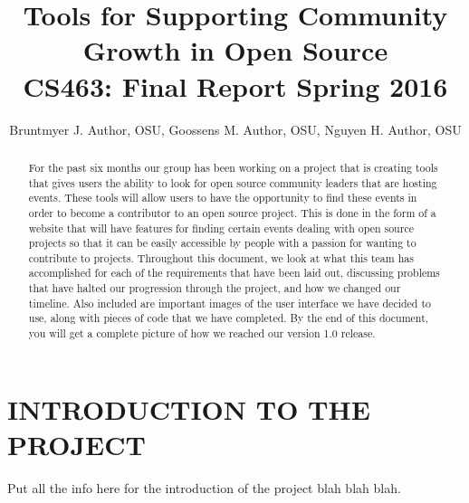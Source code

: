 \documentclass[draftclsnofoot,10pt,onecolumn]{IEEEtran} %
\begin{document}

\title{Tools for Supporting Community Growth in Open Source \\ {\large CS463: Final Report Spring 2016}}

\author{Bruntmyer J. Author, OSU, Goossens M. Author, OSU, Nguyen H. Author, OSU}



\maketitle
\begin{abstract}
For the past six months our group has been working on a project that is creating tools that
gives users the ability to look for open source community leaders that are
hosting events. These tools will allow
users to have the opportunity to find these events in order to become a
contributor to an open source project. This is done in the form of a website that
will have features for finding certain events dealing with open source projects
so that it can be easily accessible by people with a passion for wanting to
contribute to projects. Throughout this document, we look at what this team has
accomplished for each of the requirements that have been laid out, discussing problems
that have halted our progression through the project, and how we changed our timeline.
Also included are important images of the user interface we have decided
to use, along with pieces of code that we have completed. By the end of this document, 
you will get a complete picture of how we
reached our version 1.0 release.
\end{abstract}

\newpage


\section{INTRODUCTION TO THE PROJECT}

Put all the info here for the introduction of the project blah blah blah.


\end{document}
